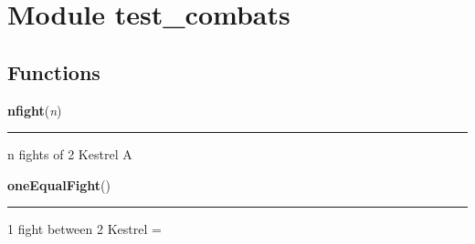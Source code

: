 %
%
%


\section{Module test\_combats}

    \label{test_combats}


  \subsection{Functions}

    \label{test_combats:nfight}

    \vspace{0.5ex}

\hspace{.8\funcindent}\begin{boxedminipage}{\funcwidth}

    \raggedright \textbf{nfight}(\textit{n})

    \vspace{-1.5ex}

    \rule{\textwidth}{0.5\fboxrule}
\setlength{\parskip}{2ex}
    n fights of 2 Kestrel A

\setlength{\parskip}{1ex}
    \end{boxedminipage}

    \label{test_combats:oneEqualFight}

    \vspace{0.5ex}

\hspace{.8\funcindent}\begin{boxedminipage}{\funcwidth}

    \raggedright \textbf{oneEqualFight}()

    \vspace{-1.5ex}

    \rule{\textwidth}{0.5\fboxrule}
\setlength{\parskip}{2ex}
    1 fight between 2 Kestrel =

\setlength{\parskip}{1ex}
    \end{boxedminipage}

